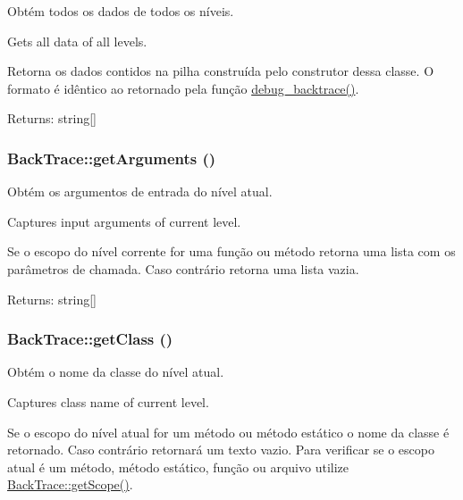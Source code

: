 Obtém todos os dados de todos os níveis.

Gets all data of all levels.

Retorna os dados contidos na pilha construída pelo construtor dessa classe. O formato é idêntico ao retornado pela função \hyperlink{}{debug\_\-backtrace()}.

\begin{Desc}
\item[Returns:]string\mbox{[}\mbox{]} \end{Desc}
\hypertarget{class_back_trace_30f81813bc02f2ebd1d15441c8377a36}{
\subsubsection[{getArguments}]{\setlength{\rightskip}{0pt plus 5cm}BackTrace::getArguments ()}}
\label{class_back_trace_30f81813bc02f2ebd1d15441c8377a36}


Obtém os argumentos de entrada do nível atual.

Captures input arguments of current level.

Se o escopo do nível corrente for uma função ou método retorna uma lista com os parâmetros de chamada. Caso contrário retorna uma lista vazia.

\begin{Desc}
\item[Returns:]string\mbox{[}\mbox{]} \end{Desc}
\hypertarget{class_back_trace_9a88ba19c59d874267ed2944a7fb052d}{
\subsubsection[{getClass}]{\setlength{\rightskip}{0pt plus 5cm}BackTrace::getClass ()}}
\label{class_back_trace_9a88ba19c59d874267ed2944a7fb052d}


Obtém o nome da classe do nível atual.

Captures class name of current level.

Se o escopo do nível atual for um método ou método estático o nome da classe é retornado. Caso contrário retornará um texto vazio. Para verificar se o escopo atual é um método, método estático, função ou arquivo utilize \hyperlink{class_back_trace_3b1b222bfb41081888742dadf70e2dfb}{BackTrace::getScope()}.

